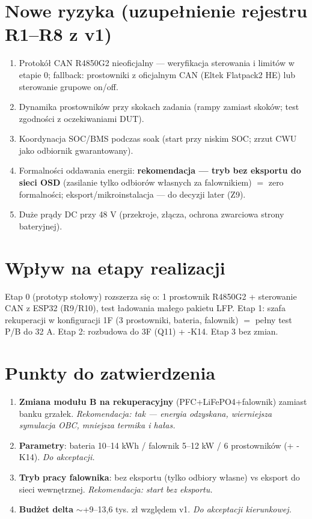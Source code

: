 \documentclass[11pt,a4paper]{article}
\begin{document}
\section{Nowe ryzyka (uzupełnienie rejestru R1--R8 z v1)}
\begin{enumerate}[label=\textbf{R\arabic*.},start=9]
\item Protokół CAN R4850G2 nieoficjalny --- weryfikacja sterowania i limitów w etapie 0; fallback: prostowniki
z oficjalnym CAN (Eltek Flatpack2 HE) lub sterowanie grupowe on/off.
\item Dynamika prostowników przy skokach zadania (rampy zamiast skoków; test zgodności z oczekiwaniami DUT).
\item Koordynacja SOC/BMS podczas soak (start przy niskim SOC; zrzut CWU jako odbiornik gwarantowany).
\item Formalności oddawania energii: \textbf{rekomendacja --- tryb bez eksportu do sieci OSD} (zasilanie tylko
odbiorów własnych za falownikiem) $=$ zero formalności; eksport/mikroinstalacja --- do decyzji later (Z9).
\item Duże prądy DC przy 48 V (przekroje, złącza, ochrona zwarciowa strony bateryjnej).
\end{enumerate}

\section{Wpływ na etapy realizacji}
Etap 0 (prototyp stołowy) rozszerza się o: 1 prostownik R4850G2 + sterowanie CAN z ESP32 (R9/R10),
test ładowania małego pakietu LFP. Etap 1: szafa rekuperacji w konfiguracji 1F (3 prostowniki, bateria,
falownik) $=$ pełny test P/B do 32 A. Etap 2: rozbudowa do 3F (Q11) + -K14. Etap 3 bez zmian.

\section{Punkty do zatwierdzenia}
\label{sec:zatw}
\begin{enumerate}[label=\textbf{Z\arabic*.},start=7]
\item \textbf{Zmiana modułu B na rekuperacyjny} (PFC+LiFePO4+falownik) zamiast banku grzałek.
\emph{Rekomendacja: tak --- energia odzyskana, wierniejsza symulacja OBC, mniejsza termika i hałas.}
\item \textbf{Parametry}: bateria 10--14 kWh / falownik 5--12 kW / 6 prostowników (+ -K14). \emph{Do akceptacji.}
\item \textbf{Tryb pracy falownika}: bez eksportu (tylko odbiory własne) vs eksport do sieci wewnętrznej.
\emph{Rekomendacja: start bez eksportu.}
\item \textbf{Budżet delta} $\sim$+9--13,6 tys. zł względem v1. \emph{Do akceptacji kierunkowej.}
\end{enumerate}
\end{document}
